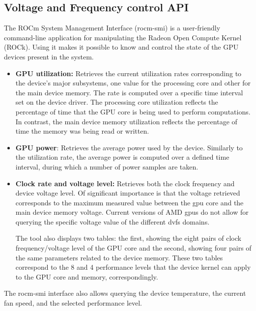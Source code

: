 \subsection{Voltage and Frequency control API}
The ROCm System Management Interface (rocm-smi) \cite{noauthor_radeonopencompute/roc-smi_2019} is a user-friendly command-line application for manipulating the Radeon Open Compute Kernel (ROCk). Using it makes it possible to know and control the state of the GPU devices present in the system. 

\begin{itemize}
\item \textbf{GPU utilization:} Retrieves the current utilization rates corresponding to the device's major subsystems, one value for the processing core and other for the main device memory. The rate is computed over a specific time interval set on the device driver. The processing core utilization reflects the percentage of time that the GPU core is being used to perform computations. In contrast, the main device memory utilization reflects the percentage of time the memory was being read or written.

\item \textbf{GPU power}: Retrieves the average power used by the device. Similarly to the utilization rate, the average power is computed over a defined time interval, during which a number of power samples are taken.

\item \textbf{Clock rate and voltage level:} Retrieves both the clock frequency and device voltage level. Of significant importance is that the voltage retrieved corresponds to the maximum measured value between the \acrshort{gpu} core and the main device memory voltage. Current versions of AMD \acrshort{gpu}s do not allow for querying the specific voltage value of the different \acrshort{dvfs} domains.

The tool also displays two tables: the first, showing the eight pairs of clock frequency/voltage level of the GPU core and the second, showing four pairs of the same parameters related to the device memory. These two tables correspond to the 8 and 4 performance levels that the device kernel can apply to the GPU core and memory, correspondingly.
\end{itemize}

The rocm-smi interface also allows querying the device temperature, the current fan speed, and the selected performance level.

